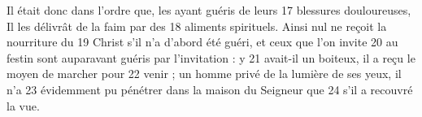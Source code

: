 Il était donc dans l'ordre que, les ayant guéris de leurs	 
17	 	blessures douloureuses, Il les délivrât de la faim par des	 
18	 	aliments spirituels. Ainsi nul ne reçoit la nourriture du	 
19	 	Christ s'il n'a d'abord été guéri, et ceux que l'on invite	 
20	 	au festin sont auparavant guéris par l'invitation : y	 
21	 	avait-il un boiteux, il a reçu le moyen de marcher pour	 
22	 	venir ; un homme privé de la lumière de ses yeux, il n'a	 
23	 	évidemment pu pénétrer dans la maison du Seigneur que	 
24	 	s'il a recouvré la vue.